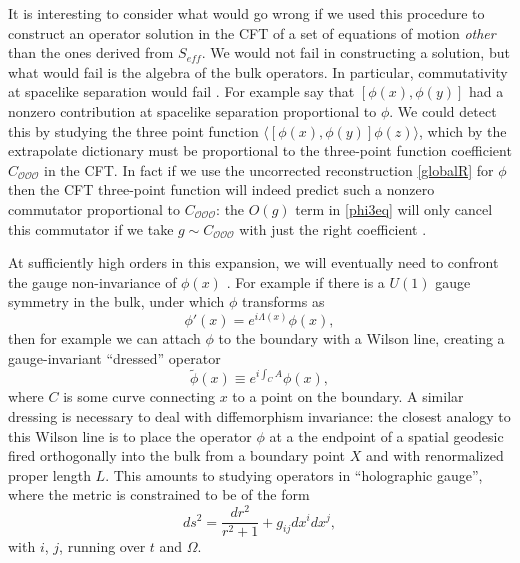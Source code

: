 \documentclass[toc]{PoS}
\newcommand{\be}{\begin{equation}}
\newcommand{\ee}{\end{equation}}
\newcommand{\lan}{\langle}
\newcommand{\ran}{\rangle}
\newcommand{\mO}{\mathcal{O}}
\newcommand{\wt}{\widetilde}
\begin{document}
It is interesting to consider what would go wrong if we used this procedure to construct an operator solution in the CFT of a set of equations of motion \textit{other} than the ones derived from $S_{eff}$.  We would not fail in constructing a solution, but what would fail is the algebra of the bulk operators. In particular, commutativity at spacelike separation would fail \cite{Kabat:2011rz}.  For example say that $[\phi(x),\phi(y)]$ had a nonzero contribution at spacelike separation proportional to $\phi$.  We could detect this by studying the three point function $\lan [\phi(x),\phi(y)] \phi(z)\ran$, which by the extrapolate dictionary must be proportional to the three-point function coefficient $C_{\mO\mO\mO}$ in the CFT.  In fact if we use the uncorrected reconstruction \eqref{globalR} for $\phi$ then the CFT three-point function will indeed predict such a nonzero commutator proportional to $C_{\mO\mO\mO}$: the $O(g)$ term in \eqref{phi3eq} will only cancel this commutator if we take $g\sim C_{\mO\mO\mO}$ with just the right coefficient \cite{Kabat:2011rz}.  

At sufficiently high orders in this expansion, we will eventually need to confront the gauge non-invariance of $\phi(x)$ \cite{Kabat:2012av,Heemskerk:2012np,Kabat:2013wga}.  For example if there is a $U(1)$ gauge symmetry in the bulk, under which $\phi$ transforms as
\be
\phi'(x)=e^{i\Lambda(x)}\phi(x),
\ee
then for example we can attach $\phi$ to the boundary with a Wilson line, creating a gauge-invariant ``dressed'' operator
\be\label{dressedphi}
\wt{\phi}(x)\equiv e^{i \int_C A}\phi(x),
\ee
where $C$ is some curve connecting $x$ to a point on the boundary.  A similar dressing is necessary to deal with diffemorphism invariance: the closest analogy to this Wilson line is to place the operator $\phi$ at a the endpoint of a spatial geodesic fired orthogonally into the bulk from a boundary point $X$ and with renormalized proper length $L$.  This amounts to studying operators in ``holographic gauge'', where the metric is constrained to be of the form
\be
ds^2=\frac{dr^2}{r^2+1}+g_{ij}dx^i dx^j,
\ee
with $i$, $j$, running over $t$ and $\Omega$.  
\end{document}
